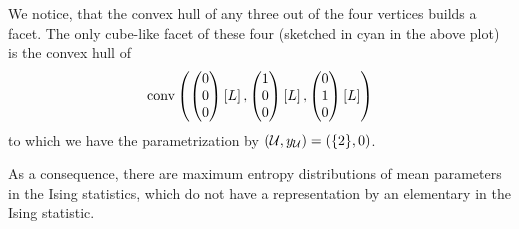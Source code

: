 \begin{example}
\begin{center}
\begin{tikzpicture}[tdplot_main_coords, scale=2,
            mainline/.style={thick},
            invisibleline/.style={dashed, gray}
        ]
        \end{tikzpicture}
    \end{center}
    We notice, that the convex hull of any three out of the four vertices builds a facet.
    The only cube-like facet of these four (sketched in cyan in the above plot) is the convex hull of
    \begin{align*}
        \mathrm{conv}\left(\begin{pmatrix} 0 \\ 0 \\ 0 \end{pmatrix}\left[L\right],\begin{pmatrix} 1 \\ 0 \\ 0 \end{pmatrix}\left[L\right],\begin{pmatrix} 0 \\ 1 \\ 0 \end{pmatrix}\left[L\right]\right)
    \end{align*}
    to which we have the parametrization by $(\mathcal{U},y_{\mathcal{U}})=(\{2\},0)$.

    As a consequence, there are maximum entropy distributions of mean parameters in the Ising statistics, which do not have a representation by an elementary \CompActNet{} in the Ising statistic.
\end{example}
